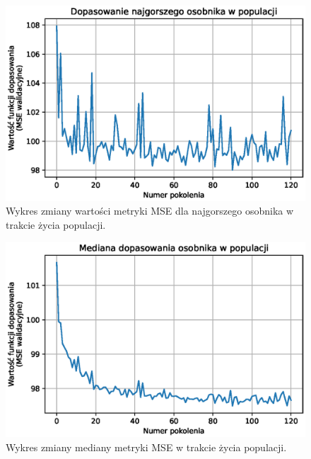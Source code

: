 \documentclass[a4paper,11pt]{article}
\begin{document}
    \bigskip

    \begin{figure}[H]
        \label{fig:g_a_worst_fitness}
        \centering
        \includegraphics[width=\textwidth]{g_a_worst_fitness}
        \caption{Wykres zmiany wartości metryki MSE dla najgorszego osobnika w trakcie życia populacji.}
    \end{figure}

    \bigskip

    \begin{figure}[H]
        \label{fig:g_a_mean_fitness}
        \centering
        \includegraphics[width=\textwidth]{g_a_mean_fitness}
        \caption{Wykres zmiany mediany metryki MSE w trakcie życia populacji.}
    \end{figure}

    \bigskip
\end{document}
